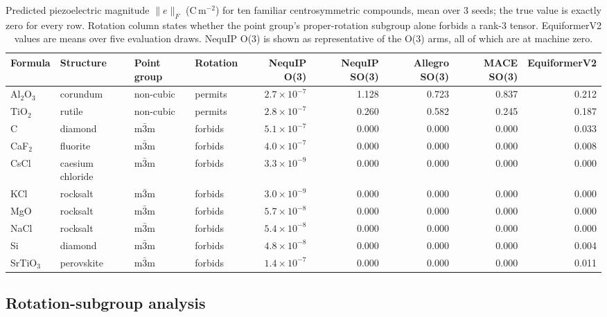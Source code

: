 \begin{table}[htbp]
\centering
\scriptsize
\caption{Predicted piezoelectric magnitude $\lVert e \rVert_F$ (C\,m$^{-2}$) for ten familiar centrosymmetric compounds, mean over 3 seeds; the true value is exactly zero for every row. Rotation column states whether the point group's proper-rotation subgroup alone forbids a rank-3 tensor. EquiformerV2 values are means over five evaluation draws. NequIP O(3) is shown as representative of the O(3) arms, all of which are at machine zero.}
\label{stab:named}
\begin{tabular}{llllrrrrr}
\toprule
Formula & Structure & Point group & Rotation & NequIP O(3) & NequIP SO(3) & Allegro SO(3) & MACE SO(3) & EquiformerV2 \\
\midrule
Al$_2$O$_3$ & corundum & non-cubic & permits & $2.7\times10^{-7}$ & 1.128 & 0.723 & 0.837 & 0.212 \\
TiO$_2$ & rutile & non-cubic & permits & $2.8\times10^{-7}$ & 0.260 & 0.582 & 0.245 & 0.187 \\
C & diamond & m$\bar 3$m & forbids & $5.1\times10^{-7}$ & 0.000 & 0.000 & 0.000 & 0.033 \\
CaF$_2$ & fluorite & m$\bar 3$m & forbids & $4.0\times10^{-7}$ & 0.000 & 0.000 & 0.000 & 0.008 \\
CsCl & caesium chloride & m$\bar 3$m & forbids & $3.3\times10^{-9}$ & 0.000 & 0.000 & 0.000 & 0.000 \\
KCl & rocksalt & m$\bar 3$m & forbids & $3.0\times10^{-9}$ & 0.000 & 0.000 & 0.000 & 0.000 \\
MgO & rocksalt & m$\bar 3$m & forbids & $5.7\times10^{-8}$ & 0.000 & 0.000 & 0.000 & 0.000 \\
NaCl & rocksalt & m$\bar 3$m & forbids & $5.4\times10^{-8}$ & 0.000 & 0.000 & 0.000 & 0.000 \\
Si & diamond & m$\bar 3$m & forbids & $4.8\times10^{-8}$ & 0.000 & 0.000 & 0.000 & 0.004 \\
SrTiO$_3$ & perovskite & m$\bar 3$m & forbids & $1.4\times10^{-7}$ & 0.000 & 0.000 & 0.000 & 0.011 \\
\bottomrule
\end{tabular}
\end{table}

\subsection*{Rotation-subgroup analysis}


